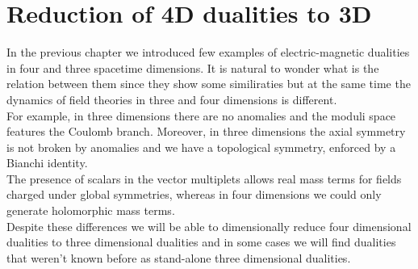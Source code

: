 
\chapter{Reduction of 4D dualities to 3D}

% 


In the previous chapter we introduced few examples of electric-magnetic dualities in four and three spacetime dimensions.
It is natural to wonder what is the relation between them since they show some similiraties but at the same time the dynamics of field theories in three and four dimensions is different.\\
For example, in three dimensions there are no anomalies and the moduli space features the Coulomb branch. 
Moreover, in three dimensions the axial symmetry is not broken by anomalies and we have a topological symmetry, enforced by a Bianchi identity.\\
The presence of scalars in the vector multiplets allows real mass terms for fields charged under global symmetries, whereas in four dimensions we could only generate holomorphic mass terms.\\
Despite these differences we will be able to dimensionally reduce four dimensional dualities to three dimensional dualities and in some cases we will find dualities that weren't known before as stand-alone three dimensional dualities.\\

